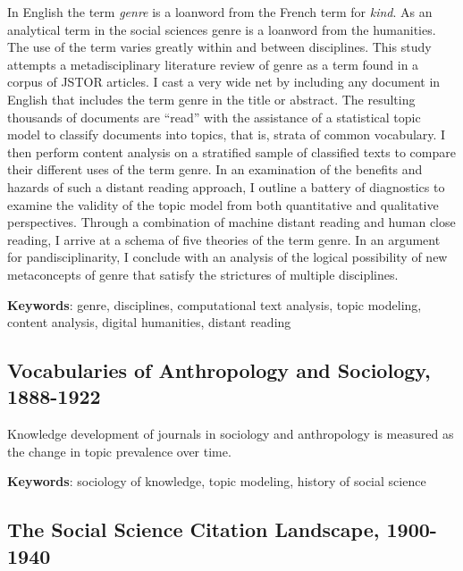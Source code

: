 \documentclass[]{book}
\theoremstyle{definition}
\theoremstyle{definition}
\theoremstyle{definition}
\theoremstyle{remark}
\begin{document}
In English the term \emph{genre} is a loanword from the
French term for \emph{kind}. As an analytical term in the social
sciences genre is a loanword from the humanities. The use of the term
varies greatly within and between disciplines. This study attempts a
metadisciplinary literature review of genre as a term found in a corpus
of JSTOR articles. I cast a very wide net by including any document in
English that includes the term genre in the title or abstract. The
resulting thousands of documents are ``read'' with the assistance of a
statistical topic model to classify documents into topics, that is,
strata of common vocabulary. I then perform content analysis on a
stratified sample of classified texts to compare their different uses of
the term genre. In an examination of the benefits and hazards of such a
distant reading approach, I outline a battery of diagnostics to examine
the validity of the topic model from both quantitative and qualitative
perspectives. Through a combination of machine distant reading and human
close reading, I arrive at a schema of five theories of the term genre.
In an argument for pandisciplinarity, I conclude with an analysis of the
logical possibility of new metaconcepts of genre that satisfy the
strictures of multiple disciplines.




\textbf{Keywords}: genre, disciplines, computational text analysis, topic
modeling, content analysis, digital humanities, distant reading

\hypertarget{vocabularies-of-anthropology-and-sociology-1888-1922}{%
\subsection{Vocabularies of Anthropology and Sociology,
1888-1922}\label{vocabularies-of-anthropology-and-sociology-1888-1922}}




Knowledge development of journals in sociology and
anthropology is measured as the change in topic prevalence over time.




\textbf{Keywords}: sociology of knowledge, topic modeling, history of social
science

\hypertarget{the-social-science-citation-landscape-1900-1940}{%
\subsection{The Social Science Citation Landscape,
1900-1940}\label{the-social-science-citation-landscape-1900-1940}}
\end{document}
